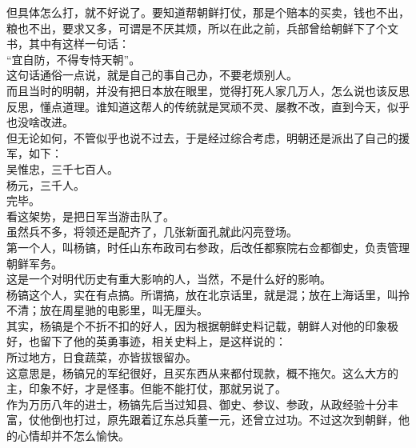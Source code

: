 \begin{multicols}{\theparacolNo}
但具体怎么打，就不好说了。要知道帮朝鲜打仗，那是个赔本的买卖，钱也不出，粮也不出，要求又多，可谓是不厌其烦，所以在此之前，兵部曾给朝鲜下了个文书，其中有这样一句话：\\

“宜自防，不得专恃天朝”。\\

这句话通俗一点说，就是自己的事自己办，不要老烦别人。\\

而且当时的明朝，并没有把日本放在眼里，觉得打死人家几万人，怎么说也该反思反思，懂点道理。谁知道这帮人的传统就是冥顽不灵、屡教不改，直到今天，似乎也没啥改进。\\

但无论如何，不管似乎也说不过去，于是经过综合考虑，明朝还是派出了自己的援军，如下：\\

吴惟忠，三千七百人。\\

杨元，三千人。\\

完毕。\\

看这架势，是把日军当游击队了。\\

虽然兵不多，将领还是配齐了，几张新面孔就此闪亮登场。\\

第一个人，叫杨镐，时任山东布政司右参政，后改任都察院右佥都御史，负责管理朝鲜军务。\\

这是一个对明代历史有重大影响的人，当然，不是什么好的影响。\\

杨镐这个人，实在有点搞。所谓搞，放在北京话里，就是混；放在上海话里，叫拎不清；放在周星驰的电影里，叫无厘头。\\

其实，杨镐是个不折不扣的好人，因为根据朝鲜史料记载，朝鲜人对他的印象极好，也留下了他的英勇事迹，相关史料上，是这样说的：\\

所过地方，日食蔬菜，亦皆拔银留办。\\

这意思是，杨镐兄的军纪很好，且买东西从来都付现款，概不拖欠。这么大方的主，印象不好，才是怪事。但能不能打仗，那就另说了。\\

作为万历八年的进士，杨镐先后当过知县、御史、参议、参政，从政经验十分丰富，仗他倒也打过，原先跟着辽东总兵董一元，还曾立过功。不过这次到朝鲜，他的心情却并不怎么愉快。\\


\end{multicols}
